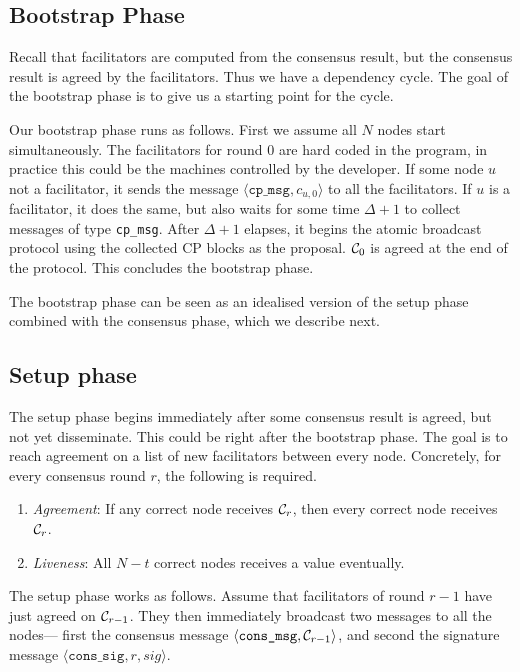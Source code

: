 \subsection{Bootstrap Phase}
\label{sec:bootstrap}
Recall that facilitators are computed from the consensus result,
but the consensus result is agreed by the facilitators.
Thus we have a dependency cycle.
The goal of the bootstrap phase is to give us a starting point for the cycle.

Our bootstrap phase runs as follows.
First we assume all $N$ nodes start simultaneously.
The facilitators for round 0 are hard coded in the program,
in practice this could be the machines controlled by the developer.
If some node $u$ not a facilitator,
it sends the message $\langle \texttt{cp\_msg}, c_{u, 0} \rangle$ to all the facilitators.
If $u$ is a facilitator, it does the same, but also waits for some time $\Delta + 1$ to collect messages of type \texttt{cp\_msg}.
After $\Delta + 1$ elapses, it begins the atomic broadcast protocol using the collected CP blocks as the proposal.
$\mathcal{C}_0$ is agreed at the end of the protocol.
This concludes the bootstrap phase.

The bootstrap phase can be seen as an idealised version of the setup phase combined with the consensus phase,
which we describe next.

\subsection{Setup phase}
The setup phase begins immediately after some consensus result is agreed, but not yet disseminate.
This could be right after the bootstrap phase.
The goal is to reach agreement on a list of new facilitators between every node.
Concretely, for every consensus round $r$, the following is required.
\begin{enumerate}
\item \emph{Agreement}: If any correct node receives $\mathcal{C}_r$,
  then every correct node receives $\mathcal{C}_r$.
\item \emph{Liveness}: All $N - t$ correct nodes receives a value eventually.
\end{enumerate}

The setup phase works as follows.
Assume that facilitators of round $r-1$ have just agreed on $\mathcal{C}_{r-1}$.
They then immediately broadcast two messages to all the nodes---
first the consensus message $\langle \texttt{cons\_msg}, \mathcal{C}_{r-1} \rangle$,
and second the signature message $\langle \texttt{cons\_sig}, r, sig \rangle$.

